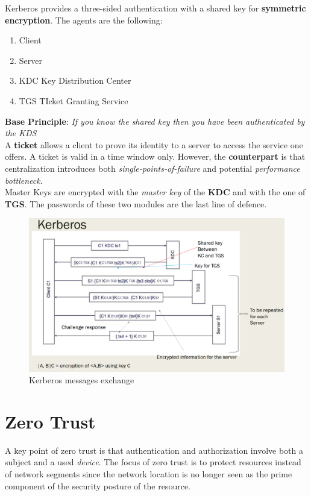 Kerberos provides a three-sided authentication with a shared key for \textbf{symmetric encryption}.
The agents are the following:
\begin{enumerate}
    \item Client
    \item Server 
    \item KDC Key Distribution Center
    \item TGS TIcket Granting Service
\end{enumerate}
\textbf{Base Principle}: \textit{If you know the shared key then you have been authenticated by the KDS}\\
A \textbf{ticket} allows a client to prove its identity to a server to access the service one offers. 
A ticket is valid in a time window only.\textit{}
However, the \textbf{counterpart }is that centralization introduces both \textit{single-points-of-failure} and potential \textit{performance bottleneck}.\\
Master Keys are encrypted with the \textit{master key} of the \textbf{KDC} and with the one of \textbf{TGS}. The passwords of these two modules are the last line of defence.
\begin{figure}
    \centering
    \includegraphics{images/kerberos_messages.png}
    \caption{Kerberos messages exchange}
    \label{fig:kerberos_messages}
\end{figure}

\section{Zero Trust}
A key point of zero trust is that authentication and authorization involve both a subject and a used \textit{device}.
The focus of zero trust is to protect resources instead of network segments since the network
location is no longer seen as the prime component of the security posture of the resource.

